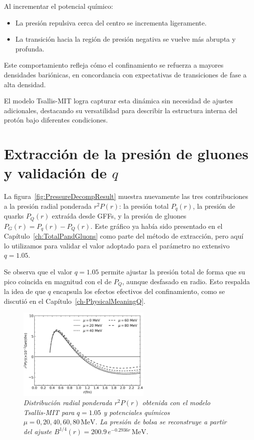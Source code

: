 Al incrementar el potencial químico:
\begin{itemize}
    \item La presión repulsiva cerca del centro se incrementa ligeramente.
    \item La transición hacia la región de presión negativa se vuelve más abrupta y profunda.
\end{itemize}

Este comportamiento refleja cómo el confinamiento se refuerza a mayores densidades bariónicas, en concordancia con expectativas de transiciones de fase a alta densidad.

El modelo Tsallis-MIT logra capturar esta dinámica sin necesidad de ajustes adicionales, destacando su versatilidad para describir la estructura interna del protón bajo diferentes condiciones.

\section{Extracción de la presión de gluones y validación de \( q \)}

La figura~\ref{fig:PressureDecompResult} muestra nuevamente las tres contribuciones a la presión radial ponderada \( r^2 P(r) \): la presión total \( P_q(r) \), la presión de quarks \( P_Q(r) \) extraída desde GFFs, y la presión de gluones \( P_G(r) = P_q(r) - P_Q(r) \). Este gráfico ya había sido presentado en el Capítulo~\ref{ch:TotalPandGluons} como parte del método de extracción, pero aquí lo utilizamos para validar el valor adoptado para el parámetro no extensivo \( q = 1.05 \).

Se observa que el valor \( q = 1.05 \) permite ajustar la presión total de forma que su pico coincida en magnitud con el de \( P_Q \), aunque desfasado en radio. Esto respalda la idea de que \( q \) encapsula los efectos efectivos del confinamiento, como se discutió en el Capítulo~\ref{ch-PhysicalMeaningQ}.

\begin{figure}
    \centering
    \includegraphics[width=0.58\textwidth]{./Images/TotalPressureTsallis.png}
    \caption[Efecto de \( \mu \) en la presión total radial]{\emph{Distribución radial ponderada \( r^2 P(r) \) obtenida con el modelo Tsallis-MIT para \( q = 1.05 \) y potenciales químicos \( \mu = 0, 20, 40, 60, 80\,\mathrm{MeV} \). La presión de bolsa se reconstruye a partir del ajuste \( B^{1/4}(r) = 200.9\,e^{-0.2936r}\,\mathrm{MeV} \).}}
    \label{fig:TotalPressureTsallis}
\end{figure}

